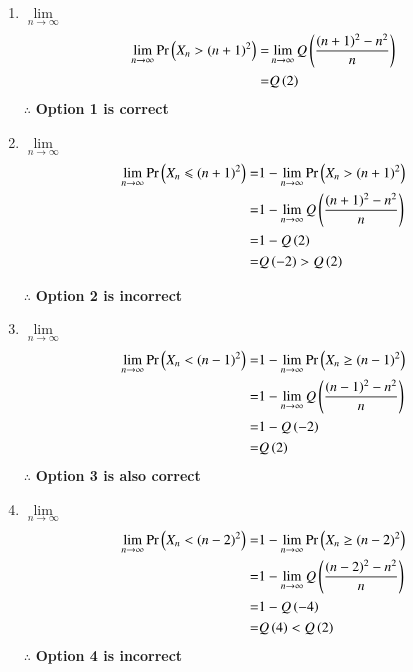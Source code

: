 \documentclass[journal,12pt,twocolumn]{IEEEtran}
\begin{document}
{\small
\begin{enumerate}
\item $\lim \limits_{n \to \infty} $ 
\begin{align}
    \lim \limits_{n \to \infty} \Pr\left(X_n > (n+1)^2\right) =& \lim \limits_{n \to \infty}Q \left(\frac{(n+1)^2-n^2}{n}\right)
    \\=&Q\left(2\right)
\end{align}
$\mathbf{\therefore}$ \textbf{Option 1 is correct}
\vspace{0.4cm}
\item $\lim \limits_{n \to \infty} $ 
\begin{align}
    \lim \limits_{n \to \infty}  \Pr\left(X_n \leqslant (n+1)^2\right) =&1-\lim \limits_{n \to \infty}  \Pr\left(X_n > (n+1)^2\right)
    \\=&1- \lim \limits_{n \to \infty}Q \left(\frac{(n+1)^2-n^2}{n}\right)
    \\=&1- Q \left(2\right)
    \\ =& Q\left(-2\right) > Q\left(2\right)
\end{align}

$\mathbf{\therefore}$ \textbf{Option 2 is incorrect}
\vspace{0.4cm}
\item $\lim \limits_{n \to \infty} $ 
\begin{align}
    \lim \limits_{n \to \infty}  \Pr\left(X_n < (n-1)^2\right) =& 1-\lim \limits_{n \to \infty}  \Pr\left(X_n \geq (n-1)^2\right)
    \\=&1-\lim \limits_{n \to \infty}Q \left(\frac{(n-1)^2-n^2}{n}\right)
    \\=& 1-Q \left(-2\right)
    \\=& Q\left(2\right)
\end{align}
$\mathbf{\therefore}$ \textbf{Option 3 is also correct}
\vspace{0.4cm}
\item $\lim \limits_{n \to \infty} $ 
\begin{align}
    \lim \limits_{n \to \infty}  \Pr\left(X_n < (n-2)^2\right) =& 1-\lim \limits_{n \to \infty}  \Pr\left(X_n \geq (n-2)^2\right)
    \\=&1-\lim \limits_{n \to \infty}Q \left(\frac{(n-2)^2-n^2}{n}\right)
    \\=&1- Q \left(-4\right)
    \\=& Q\left(4\right) < Q \left(2\right)
\end{align}
$\mathbf{\therefore}$ \textbf{Option 4 is incorrect}
\end{enumerate}
}%
\end{document}
